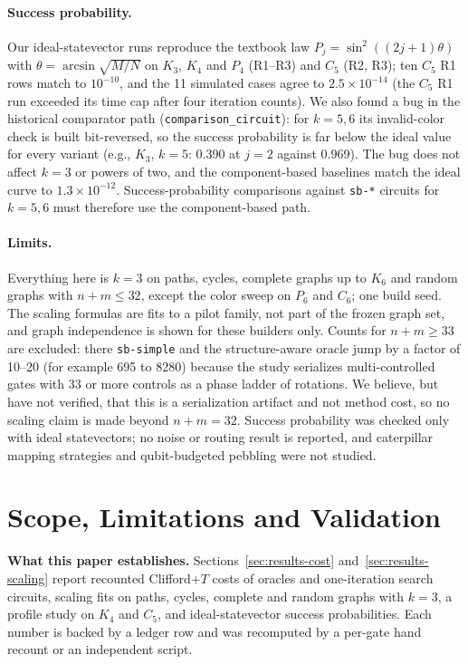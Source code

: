 \documentclass[sigconf, natbib]{acmart}
\begin{document}
\paragraph{Success probability.} %
Our ideal-statevector runs reproduce the textbook law $P_j=\sin^2((2j+1)\theta)$ with $\theta=\arcsin\sqrt{M/N}$ on $K_3$, $K_4$ and $P_4$ (R1--R3) and $C_5$ (R2, R3); ten $C_5$ R1 rows match to $10^{-10}$, and the 11 simulated cases agree to $2.5\times10^{-14}$ (the $C_5$ R1 run exceeded its time cap after four iteration counts). We also found a bug in the historical comparator path (\texttt{comparison\_circuit}): for $k=5,6$ its invalid-color check is built bit-reversed, so the success probability is far below the ideal value for every variant (e.g., $K_3$, $k=5$: 0.390 at $j=2$ against 0.969). The bug does not affect $k=3$ or powers of two, and the component-based baselines match the ideal curve to $1.3\times10^{-12}$. Success-probability comparisons against \texttt{sb-*} circuits for $k=5,6$ must therefore use the component-based path. %

\paragraph{Limits.} Everything here is $k=3$ on paths, cycles, complete graphs up to $K_6$ and random graphs with $n+m\le 32$, except the color sweep on $P_6$ and $C_6$; one build seed. The scaling formulas are fits to a pilot family, not part of the frozen graph set, and graph independence is shown for these builders only. Counts for $n+m\ge 33$ are excluded: there \texttt{sb-simple} and the structure-aware oracle jump by a factor of 10--20 (for example 695 to 8280) because the study serializes multi-controlled gates with 33 or more controls as a phase ladder of rotations. We believe, but have not verified, that this is a serialization artifact and not method cost, so no scaling claim is made beyond $n+m=32$. Success probability was checked only with ideal statevectors; no noise or routing result is reported, and caterpillar mapping strategies and qubit-budgeted pebbling were not studied.

\section{Scope, Limitations and Validation}
\label{sec:experiments}
\textbf{What this paper establishes.} Sections~\ref{sec:results-cost} and~\ref{sec:results-scaling} report recounted Clifford+$T$ costs of oracles and one-iteration search circuits, scaling fits on paths, cycles, complete and random graphs with $k=3$, a profile study on $K_4$ and $C_5$, and ideal-statevector success probabilities. Each number is backed by a ledger row and was recomputed by a per-gate hand recount or an independent script.
\end{document}
